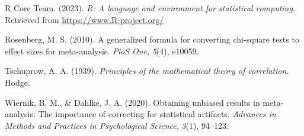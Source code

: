 \documentclass[
]{article}
\newlength{\cslhangindent}
\newlength{\cslentryspacingunit} %
\newenvironment{CSLReferences}[2] %
 {%
  \setlength{\parindent}{0pt}
  \ifodd #1
  \let\oldpar\par
  \def\par{\hangindent=\cslhangindent\oldpar}
  \fi
  \setlength{\parskip}{#2\cslentryspacingunit}
 }%
 {}
\begin{document}
\begin{CSLReferences}{1}{0}
\leavevmode{}%
R Core Team. (2023). \emph{R: A language and environment for statistical
computing}. Retrieved from \url{https://www.R-project.org/}

\leavevmode{}%
Rosenberg, M. S. (2010). A generalized formula for converting chi-square
tests to effect sizes for meta-analysis. \emph{PloS One}, \emph{5}(4),
e10059.

\leavevmode{}%
Tschuprow, A. A. (1939). \emph{Principles of the mathematical theory of
correlation}. Hodge.

\leavevmode{}%
Wiernik, B. M., \& Dahlke, J. A. (2020). Obtaining unbiased results in
meta-analysis: The importance of correcting for statistical artifacts.
\emph{Advances in Methods and Practices in Psychological Science},
\emph{3}(1), 94--123.

\end{CSLReferences}
\end{document}
